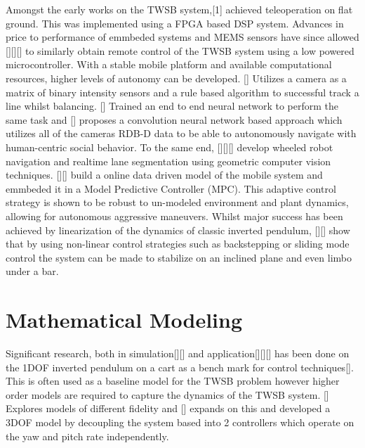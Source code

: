     Amongst the early works on the TWSB system,[1] achieved teleoperation on flat ground. 
    This was implemented using a FPGA based DSP system. 
    Advances in price to performance of emmbeded systems and MEMS sensors have since allowed 
    [][][] to similarly obtain remote control of the TWSB system using a low powered microcontroller.
    With a stable mobile platform and available computational resources, higher levels of autonomy can be developed. 
    [] Utilizes a camera as a matrix of binary intensity sensors and a rule based algorithm to successful track 
    a line whilst balancing. [] Trained an end to end neural network to perform the same task and [] proposes 
    a convolution neural network based approach which utilizes all of the cameras RDB-D data to be able to 
    autonomously navigate with human-centric social behavior. 
    To the same end, [][][] develop wheeled robot navigation and realtime lane segmentation using 
    geometric computer vision techniques. 
    [][] build a online data driven model of the mobile system and emmbeded it in a Model Predictive Controller (MPC). 
    This adaptive control strategy is shown to be robust to un-modeled environment and plant dynamics, 
    allowing for autonomous aggressive maneuvers. 
    Whilst major success has been achieved by linearization of the dynamics of classic inverted pendulum, 
    [][] show that by using non-linear control strategies such as backstepping or sliding mode control
    the system can be made to stabilize on an inclined plane and even limbo under a bar.
    \pagebreak{}

  \pagebreak{}
  \section{Mathematical Modeling} %
    Significant research, both in simulation[][] and application[][][] 
    has been done on the 1DOF inverted pendulum on a cart as a bench mark for control techniques[]. 
    This is often used as a baseline model for the TWSB problem however higher order models are 
    required to capture the dynamics of the TWSB system. [] Explores models of different fidelity 
    and [] expands on this and developed a 3DOF model by decoupling the system based into 2 controllers which 
    operate on the yaw and pitch rate independently.
    \pagebreak{}
